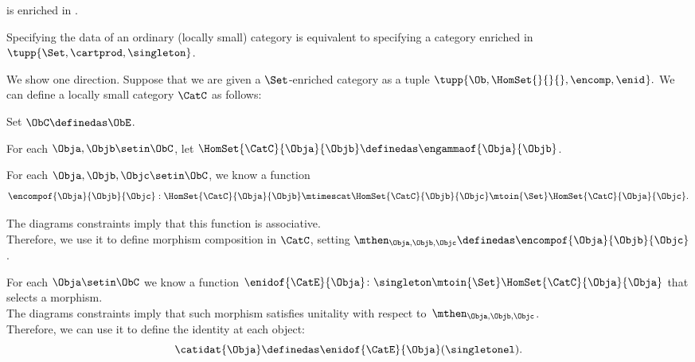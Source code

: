 {    \begin{example}
        \Category is enriched in \Category.
    \end{example}

    \begin{exercise}
        \label{ex:every-cat-set}
        Specifying the data of an ordinary (locally small) category is equivalent to specifying a category enriched in $\tupp{\Set,\cartprod, \singleton}$.
    \end{exercise}
    \begin{solution}
        We show one direction.
        Suppose that we are given a $\Set$-enriched category as a tuple
        $\tupp{\Ob, \HomSet{}{}{}, \encomp, \enid_{}}.
        $
        We can define a locally small category $\CatC$  as follows:
        \begin{compactitem}
            \item Set $\ObC \definedas \ObE$.
            \item For each $\Obja,\Objb\setin\ObC$, let $\HomSet{\CatC}{\Obja}{\Objb} \definedas \engammaof{\Obja}{\Objb}$.
            \item For each $\Obja,\Objb,\Objc \setin \ObC$, we know a function
                  \begin{equation}
                      \encompof{\Obja}{\Objb}{\Objc}:\HomSet{\CatC}{\Obja}{\Objb}\mtimescat \HomSet{\CatC}{\Objb}{\Objc}\mtoin{\Set} \HomSet{\CatC}{\Obja}{\Objc}.
                  \end{equation}

                  The diagrams constraints imply that this function is associative.
                  \\Therefore, we use it to define morphism composition in $\CatC$, setting $\mthen_{\Obja,\Objb,\Objc}\definedas \encompof{\Obja}{\Objb}{\Objc}$.
            \item For each $\Obja\setin\ObC$ we know a function $\enidof{\CatE}{\Obja}\colon\singleton\mtoin{\Set} \HomSet{\CatC}{\Obja}{\Obja}$ that selects a morphism.\\
                  The diagrams constraints imply that such morphism satisfies unitality
                  with respect to~$\mthen_{\Obja,\Objb,\Objc}$. \\Therefore, we can use it to define the identity at each object:
                  \begin{equation}
                      \label{eq:ja-hom}
                      \catidat{\Obja} \definedas \enidof{\CatE}{\Obja}(\singletonel).
                  \end{equation}
        \end{compactitem}
    \end{solution}

}

